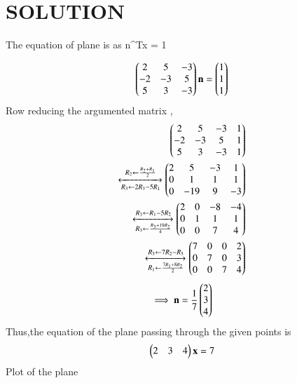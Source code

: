 \documentclass[journal,12pt,twocolumn]{IEEEtran}
\begin{document}
\section{SOLUTION}  
The equation of plane is as n^Tx = 1 
\begin{enumerate}
\begin{align}
\begin{pmatrix}2 & 5 & -3\\-2 & -3 & 5\\5 & 3 & -3\end{pmatrix} \mathbf{n} = \begin{pmatrix}1\\1\\1\end{pmatrix}
\end{align}
Row reducing the argumented matrix ,
\begin{align}
\begin{pmatrix}2 & 5 & -3 & 1\\-2 & -3 & 5 & 1\\5 & 3 & -3 & 1\end{pmatrix}\\ 
\xleftrightarrow[R_3\leftarrow 2R_3-5R_1]{R_2\leftarrow \frac{R_2+R_1}{2}}\begin{pmatrix}2 & 5 & -3 & 1\\0 & 1 & 1 & 1\\0 & -19 & 9 & -3\end{pmatrix}
\\
\xleftrightarrow[R_3\leftarrow \frac{R_3+19R_2}{4}]{R_3\leftarrow R_1-5R_2}\begin{pmatrix}2 & 0 & -8 & -4\\0 & 1 & 1 & 1\\0 & 0 & 7 & 4\end{pmatrix}
\\
\xleftrightarrow[R_1\leftarrow \frac{7R_1+8R_2}{2}]{R_3\leftarrow 7R_2-R_3}\begin{pmatrix}7& 0& 0 & 2\\0 & 7 & 0 & 3\\0 & 0  & 7 & 4\end{pmatrix}
\end{align}
\begin{align}
\implies \mathbf{n} = \frac{1}{7}\begin{pmatrix}2\\3\\4\end{pmatrix}
\end{align}
Thus,the equation of the plane passing through the given points is 
\begin{align}
\begin{pmatrix}2 & 3 & 4\end{pmatrix}\mathbf{x} = 7  
\end{align}
Plot of the plane 
\begin{figure}[ht]

\end{figure}
\end{enumerate}
\end{document}
